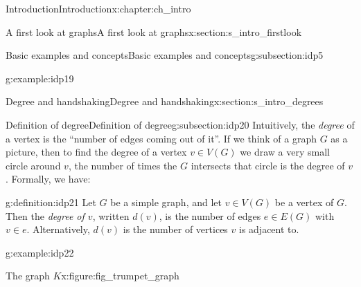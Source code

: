 \documentclass[oneside,10pt,]{book}
\numberwithin{equation}{section}
\begin{document}
\begin{chapterptx}{Introduction}{}{Introduction}{}{}{x:chapter:ch_intro}
\begin{sectionptx}{A first look at graphs}{}{A first look at graphs}{}{}{x:section:s_intro_firstlook}
\begin{subsectionptx}{Basic examples and concepts}{}{Basic examples and concepts}{}{}{g:subsection:idp5}
\begin{example}{}{g:example:idp19}
\begin{image}{0.05}{0.9}{0.05}
{
}%
\end{image}%
\end{example}
\end{subsectionptx}
\end{sectionptx}
%
%
\typeout{************************************************}
\typeout{************************************************}
%
\begin{sectionptx}{Degree and handshaking}{}{Degree and handshaking}{}{}{x:section:s_intro_degrees}
%
%
\typeout{************************************************}
\typeout{************************************************}
%
\begin{subsectionptx}{Definition of degree}{}{Definition of degree}{}{}{g:subsection:idp20}
Intuitively, the \emph{degree} of a vertex is the ``number of edges coming out of it''. If we think of a graph \(G\) as a picture, then to find the degree of a vertex \(v\in V(G)\) we draw a very small circle around \(v\), the number of times the \(G\) intersects that circle is the degree of \(v\).  Formally, we have:%
\begin{definition}{}{g:definition:idp21}%
Let \(G\) be a simple graph, and let \(v\in V(G)\) be a vertex of \(G\).  Then the \emph{degree of \(v\)}, written \(d(v)\), is the number of edges \(e\in E(G)\) with \(v\in e\). Alternatively, \(d(v)\) is the number of vertices \(v\) is adjacent to.%
\end{definition}
\begin{example}{}{g:example:idp22}%
\begin{figureptx}{The graph \(K\)}{x:figure:fig_trumpet_graph}{}%
\begin{image}{0.25}{0.5}{0.25}%

\end{image}
\end{figureptx}
\end{example}
\end{subsectionptx}
\end{sectionptx}
\end{chapterptx}
\end{document}

